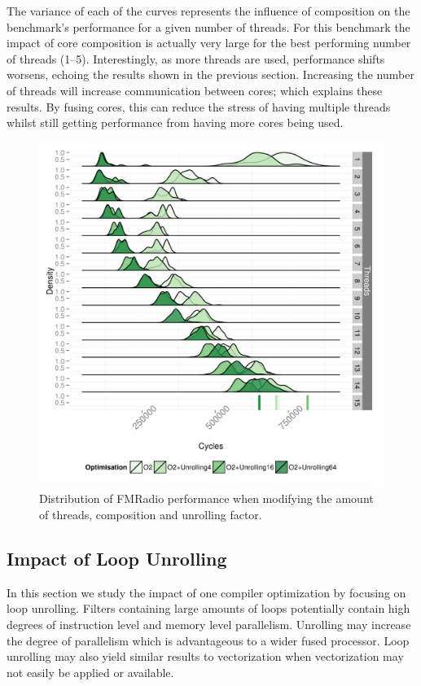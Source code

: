 The variance of each of the curves represents the influence of composition on the benchmark's performance for a given number of threads.
For this benchmark the impact of core composition is actually very large for the best performing number of threads (1--5).
Interestingly, as more threads are used,  performance shifts worsens, echoing the results shown in the previous section.
Increasing the number of threads will increase communication between cores; which explains these results.
By fusing cores, this can reduce the stress of having multiple threads whilst still getting performance from having more cores being used.

\begin{figure}[t]
  \includegraphics[width=1\textwidth]{streamit-paper/graphics/unrolled_fm.pdf}
  \caption{Distribution of FMRadio performance when modifying the amount of threads, composition and unrolling factor.}\label{fig:fmunroll}
\end{figure}

\subsection{Impact of Loop Unrolling}
In this section we study the impact of one compiler optimization by focusing on loop unrolling.
Filters containing large amounts of loops potentially contain high degrees of instruction level and memory level parallelism.
Unrolling may increase the degree of parallelism which is advantageous to a wider fused processor.
Loop unrolling may also yield similar results to vectorization when vectorization may not easily be applied or available.

